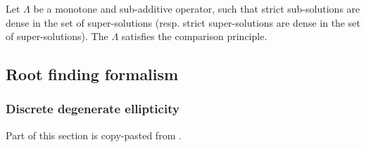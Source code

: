

\begin{corollary}	
	Let $\Lambda$ be a monotone and sub-additive operator, such that strict sub-solutions are dense in the set of super-solutions (resp. strict super-solutions are dense in the set of super-solutions). 
	The $\Lambda$ satisfies the comparison principle.
\end{corollary}



\subsection{Root finding formalism}


\subsubsection{Discrete degenerate ellipticity}

Part of this section is copy-pasted from \cite[Appendix A]{mirebeau2019riemannian}.


